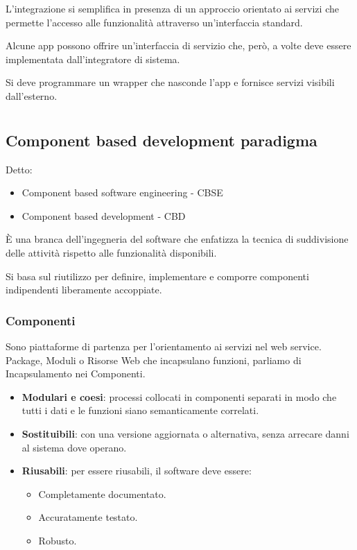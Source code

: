 \documentclass{report}
\begin{document}
\noindent
L'integrazione si semplifica in presenza di un approccio orientato ai servizi che permette l'accesso alle funzionalità attraverso un'interfaccia standard.

\smallskip
\noindent
Alcune app possono offrire un'interfaccia di servizio che, però, a volte deve essere implementata dall'integratore di sistema.

\noindent
Si deve programmare un wrapper che nasconde l'app e fornisce servizi visibili dall'esterno.

\chapter{}
\section{Component based development paradigma}
Detto:
\begin{itemize}
    \item Component based software engineering - CBSE
    \item Component based development - CBD
\end{itemize}

\`E una branca dell'ingegneria del software che enfatizza la tecnica di suddivisione delle attività rispetto alle funzionalità disponibili.

\noindent
Si basa sul riutilizzo per definire, implementare e comporre componenti indipendenti liberamente accoppiate.

\subsection*{Componenti}
Sono piattaforme di partenza per l'orientamento ai servizi nel web service. Package, Moduli o Risorse Web che incapsulano funzioni, parliamo di Incapsulamento nei Componenti.

\begin{itemize}
    \item \textbf{Modulari e coesi}: processi collocati in componenti separati in modo che tutti i dati e le funzioni siano semanticamente correlati.
    \item \textbf{Sostituibili}: con una versione aggiornata o alternativa, senza arrecare danni al sistema dove operano.
    \item \textbf{Riusabili}: per essere riusabili, il software deve essere:
    \begin{itemize}
        \item Completamente documentato.
        \item Accuratamente testato.
        \item Robusto.
    \end{itemize}
\end{itemize}
\end{document}
